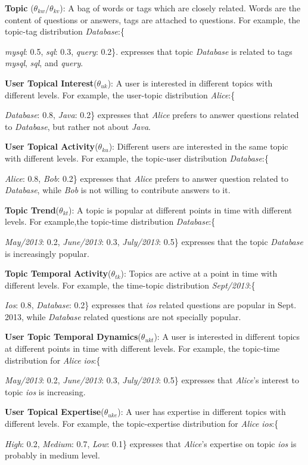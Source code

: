 \textbf{Topic} ($\theta_{kw}/\theta_{kv}$): A bag of words or tags which are closely related. Words are the content of questions or answers, tags are attached to questions. For example, the topic-tag distribution \textit{Database}:\{{\textit{mysql}: 0.5, \textit{sql}: 0.3, \textit{query}: 0.2\}. expresses that topic \textit{Database} is related to tags \textit{mysql}, \textit{sql}, and \textit{query}. 

\textbf{User Topical Interest}($\theta_{uk}$): A user is interested in different topics with different levels. For example, the user-topic distribution \textit{Alice}:\{{\textit{Database}: 0.8, \textit{Java}: 0.2\} expresses that \textit{Alice} prefers to answer questions related to \textit{Database}, but rather not about \textit{Java}. 

\textbf{User Topical Activity}($\theta_{ku}$):  Different users are interested in the same topic with different levels. For example, the topic-user distribution \textit{Database}:\{{\textit{Alice}: 0.8, \textit{Bob}: 0.2\} expresses that \textit{Alice} prefers to answer question related to \textit{Database}, while \textit{Bob} is not willing to contribute answers to it.

\textbf{Topic Trend}($\theta_{kt}$): A topic is popular at different points in time with different levels. For example,the topic-time distribution \textit{Database}:\{{\textit{May/2013}: 0.2, \textit{June/2013}: 0.3, \textit{July/2013}: 0.5\} expresses that the topic \textit{Database} is increasingly popular.%

\textbf{Topic Temporal Activity}($\theta_{tk}$): Topics are active at a point in time with different levels. For example, the time-topic distribution \textit{Sept/2013}:\{{\textit{Ios}: 0.8, \textit{Database}: 0.2\} expresses that \textit{ios} related questions are popular in Sept. 2013, while \textit{Database} related questions are not specially popular.

\textbf{User Topic Temporal Dynamics}($\theta_{ukt}$): A user is interested in different topics at different points in time with different levels. For example, the topic-time distribution for \textit{Alice} \textit{ios}:\{{\textit{May/2013}: 0.2, \textit{June/2013}: 0.3, \textit{July/2013}: 0.5\} expresses that \textit{Alice}'s interest to topic \textit{ios} is increasing.


\textbf{User Topical Expertise}($\theta_{uke}$): A user has expertise in different topics with different levels. For example, the topic-expertise distribution for \textit{Alice} \textit{ios}:\{{\textit{High}: 0.2, \textit{Medium}: 0.7, \textit{Low}: 0.1\} expresses that \textit{Alice}'s expertise on topic \textit{ios} is probably in medium level.

}}}}}}}
